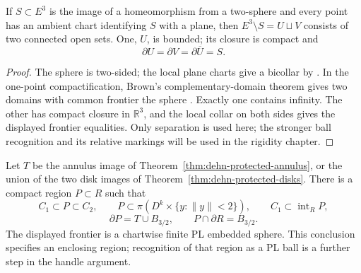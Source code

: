 \begin{lemma}
\label{lem:dehn-sphere-separation}
If
$S\subset E^3$ is the image of a homeomorphism from a two-sphere
and every point has an ambient chart identifying $S$ with a plane,
then $E^3\setminus S=U\sqcup V$ consists of two connected open
sets.  One, $U$, is bounded; its closure is compact and
\[
        \partial U=\partial V=\partial\overline U=S.
\]
\end{lemma}
\begin{proof}
The sphere is two-sided; the local plane charts give a bicollar by
\cite[Theorem 3, p.~339]{Brown1962}. In the one-point compactification,
Brown's complementary-domain theorem gives two domains with common
frontier the sphere \cite[Theorem 5, p.~76]{Brown1960}. Exactly one
contains infinity. The other has compact closure in $\mathbb R^3$,
and the local collar on both sides gives the displayed frontier
equalities. Only separation is used here; the stronger ball recognition
and its relative markings will be used in the rigidity chapter.
\end{proof}

\begin{theorem}
\label{thm:dehn-enclosing-region}
Let $T$ be the annulus image of
Theorem~\ref{thm:dehn-protected-annulus}, or the union of the two
disk images of Theorem~\ref{thm:dehn-protected-disks}.
There is a compact region $P\subset R$ such that
\[
 C_1\subset P\subset C_2,\qquad
 P\subset\pi(D^k\times\{y:\|y\|<2\}),\qquad
 C_1\subset\operatorname{int}_R P,
\]
\[
       \partial P=T\cup B_{3/2},\qquad
       P\cap\partial R=B_{3/2}.
\]
The displayed frontier is a chartwise finite PL embedded sphere.
This conclusion specifies an enclosing region; recognition of that
region as a PL ball is a further step in the handle argument.
\end{theorem}

